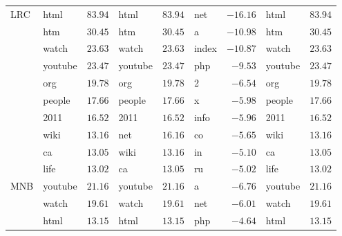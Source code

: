 \begin{table}[htb]
\begin{tabular}{llrlrlrlr}
        \midrule
        \multirow{10}{*}{LRC}   & html      & \( 83.94 \)           & html      & \( 83.94 \)       & net      & \( -16.16 \)       & html      & \( 83.94 \)       \\
                                & htm       & \( 30.45 \)           & htm       & \( 30.45 \)       & a        & \( -10.98 \)       & htm       & \( 30.45 \)       \\
                                & watch     & \( 23.63 \)           & watch     & \( 23.63 \)       & index    & \( -10.87 \)       & watch     & \( 23.63 \)       \\
                                & youtube   & \( 23.47 \)           & youtube   & \( 23.47 \)       & php      & \( -9.53 \)        & youtube   & \( 23.47 \)       \\
                                & org       & \( 19.78 \)           & org       & \( 19.78 \)       & 2        & \( -6.54 \)        & org       & \( 19.78 \)       \\
                                & people    & \( 17.66 \)           & people    & \( 17.66 \)       & x        & \( -5.98 \)        & people    & \( 17.66 \)       \\
                                & 2011      & \( 16.52 \)           & 2011      & \( 16.52 \)       & info     & \( -5.96 \)        & 2011      & \( 16.52 \)       \\
                                & wiki      & \( 13.16 \)           & net       & \( 16.16 \)       & co       & \( -5.65 \)        & wiki      & \( 13.16 \)       \\
                                & ca        & \( 13.05 \)           & wiki      & \( 13.16 \)       & in       & \( -5.10 \)        & ca        & \( 13.05 \)       \\
                                & life      & \( 13.02 \)           & ca        & \( 13.05 \)       & ru       & \( -5.02 \)        & life      & \( 13.02 \)       \\
        \midrule
        \multirow{10}{*}{MNB}   & youtube   & \( 21.16 \)           & youtube   & \( 21.16 \)       & a        & \( -6.76 \)        & youtube   & \( 21.16 \)       \\
                                & watch     & \( 19.61 \)           & watch     & \( 19.61 \)       & net      & \( -6.01 \)        & watch     & \( 19.61 \)       \\
                                & html      & \( 13.15 \)           & html      & \( 13.15 \)       & php      & \( -4.64 \)        & html      & \( 13.15 \)       \\

\end{tabular}
\end{table}
